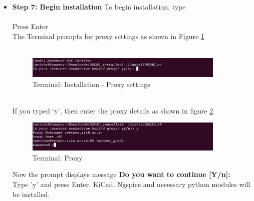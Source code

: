 \begin{itemize}
\item{\textbf{Step 7: Begin installation }}
To begin installation, type\\
\newline
{}\\
Press Enter\\
\newline
The Terminal prompts for proxy settings as shown in Figure \ref{proxy} \\
\\
\newline
\begin{figure}[h!]
\centering
\includegraphics[width=0.9\textwidth]{figures/install4.png}
\caption{Terminal: Installation - Proxy settings}
\label{proxy}
\end{figure}\\
\newpage
If you typed `y', then enter the proxy details as shown in figure \ref{proxys}
\begin{figure}[h]
\centering
\includegraphics[width=0.9\textwidth]{figures/install5.png}
\caption{Terminal: Proxy}
\label{proxys}
\end{figure}
\newline
Now the prompt displays message 
\textbf{Do you want to continue [Y/n]:}\\
Type 'y' and press Enter. KiCad, Ngspice and necessary python modules will be installed.\\
\newline
{}
\end{itemize}
